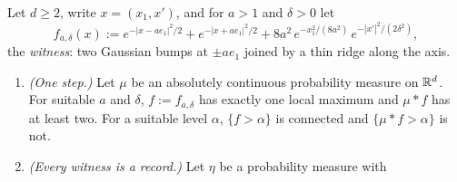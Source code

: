 \begin{proposition}
\label{prop:creation-plane}
\leanok
Let $d \ge 2$, write $x = (x_1, x')$, and for $a > 1$ and $\delta > 0$ let
\[
  f_{a,\delta}(x) := e^{-|x - ae_1|^2/2} + e^{-|x + ae_1|^2/2}
   + 8a^2\,e^{-x_1^2/(8a^2)}\,e^{-|x'|^2/(2\delta^2)} ,
\]
the \emph{witness}: two Gaussian bumps at $\pm ae_1$ joined by a thin ridge along the axis.
\begin{enumerate}
\item \emph{(One step.)} Let $\mu$ be an absolutely continuous probability measure on
$\mathbb{R}^d$. For suitable $a$ and $\delta$, $f := f_{a,\delta}$ has exactly one
local maximum and $\mu * f$ has at least two. For a suitable level $\alpha$, $\{f > \alpha\}$ is
connected and $\{\mu * f > \alpha\}$ is not.
\item \emph{(Every witness is a record.)} Let $\eta$ be a probability measure with

\end{enumerate}
\end{proposition}

